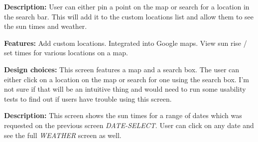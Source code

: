 \documentclass[11pt,english,numbers=endperiod,parskip=half]{scrartcl}
\begin{document}
\begin{figure}[H]
\end{figure}
\bigskip
\textbf{Description: }User can either pin a point on the map or search for a
location in the search bar. This will add it to the custom locations list and
allow them to see the sun times and weather.

\textbf{Features: }Add custom locations. Integrated into Google maps. View sun
rise / set times for various locations on a map.

\textbf{Design choices: }This screen features a map and a search box. The user
can either click on a location on the map or search for one using the search box.
I'm not sure if that will be an intuitive thing and would need to run some usability
tests to find out if users have trouble using this screen.

\begin{figure}[H]
\end{figure}
\bigskip
\textbf{Description: }This screen shows the sun times for a range of dates which
was requested on the previous screen \textit{DATE-SELECT}. User can click on any
date and see the full \textit{WEATHER} screen as well.
\end{document}
